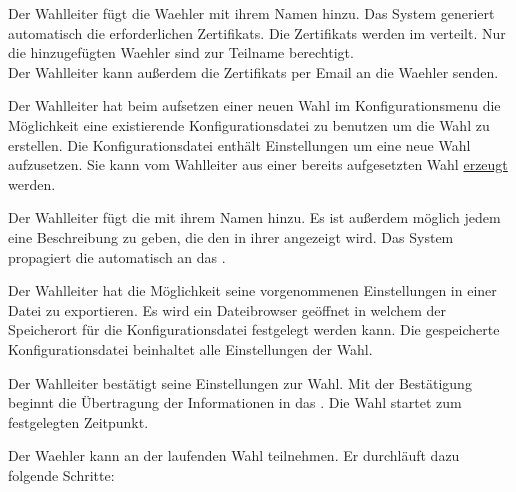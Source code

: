 \documentclass[parskip=full,11pt,twoside]{scrartcl}
\begin{document}
Der \gls{Wahlleiter} fügt die \gls{Waehler} mit ihrem Namen hinzu. Das System generiert automatisch die erforderlichen \glspl{Zertifikat}. Die \glspl{Zertifikat} werden im  verteilt. Nur die hinzugefügten \gls{Waehler} sind zur Teilname berechtigt. \\
Der \gls{Wahlleiter} kann außerdem die \glspl{Zertifikat} per Email an die \gls{Waehler} senden.

Der \gls{Wahlleiter} hat beim aufsetzen einer neuen \gls{Wahl} im \gls{Konfigurationsmenu} die Möglichkeit eine existierende Konfigurationsdatei zu benutzen um die \gls{Wahl} zu erstellen.
Die Konfigurationsdatei enthält Einstellungen um eine neue \gls{Wahl} aufzusetzen. Sie kann vom \gls{Wahlleiter} aus einer bereits aufgesetzten \gls{Wahl} \hyperref[fnc:export]{erzeugt} werden.

Der \gls{Wahlleiter} fügt die  mit ihrem Namen hinzu. Es ist außerdem möglich jedem  eine Beschreibung zu geben, die den  in ihrer  angezeigt wird. Das System propagiert die  automatisch an das .

Der \gls{Wahlleiter} hat die Möglichkeit seine vorgenommenen Einstellungen in einer Datei zu exportieren.
Es wird ein \gls{Dateibrowser} geöffnet in welchem der Speicherort für die Konfigurationsdatei festgelegt werden kann.
Die gespeicherte Konfigurationsdatei beinhaltet alle Einstellungen der \gls{Wahl}.

Der \gls{Wahlleiter} bestätigt seine Einstellungen zur \gls{Wahl}. Mit der Bestätigung beginnt die Übertragung der Informationen in das . Die \gls{Wahl} startet zum festgelegten Zeitpunkt.

Der \gls{Waehler} kann an der laufenden \gls{Wahl} teilnehmen. Er durchläuft dazu folgende Schritte:
\end{document}
